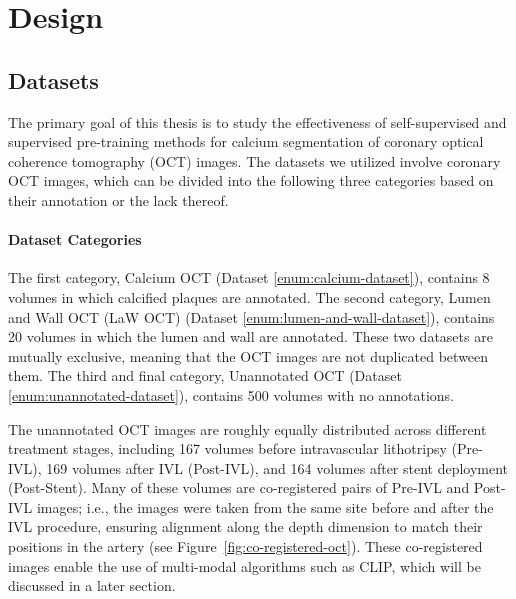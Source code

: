 \documentclass[a4paper,11pt,oneside]{report}
\begin{document}
\chapter{Design}



\section{Datasets}\label{sec:design:datasets}
The primary goal of this thesis is to study the effectiveness of self-supervised and supervised pre-training methods for calcium segmentation of coronary optical coherence tomography (OCT) images. The datasets we utilized involve coronary OCT images, which can be divided into the following three categories based on their annotation or the lack thereof. 

\subsubsection{Dataset Categories}

The first category, Calcium OCT (Dataset \ref{enum:calcium-dataset}), contains 8 volumes in which calcified plaques are annotated. The second category, Lumen and Wall OCT (LaW OCT) (Dataset \ref{enum:lumen-and-wall-dataset}), contains 20 volumes in which the lumen and wall are annotated. These two datasets are mutually exclusive, meaning that the OCT images are not duplicated between them. The third and final category, Unannotated OCT (Dataset \ref{enum:unannotated-dataset}), contains 500 volumes with no annotations. 

The unannotated OCT images are roughly equally distributed across different treatment stages, including 167 volumes before intravascular lithotripsy (Pre-IVL), 169 volumes after IVL (Post-IVL), and 164 volumes after stent deployment (Post-Stent). Many of these volumes are co-registered pairs of Pre-IVL and Post-IVL images; i.e., the images were taken from the same site before and after the IVL procedure, ensuring alignment along the depth dimension to match their positions in the artery (see Figure~\ref{fig:co-registered-oct}). These co-registered images enable the use of multi-modal algorithms such as CLIP, which will be discussed in a later section.
\end{document}

